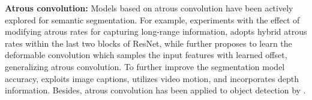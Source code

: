 \textbf{Atrous convolution:} Models based on atrous convolution have been actively explored for semantic segmentation. For example, \cite{wu2016bridging} experiments with the effect of modifying atrous rates for capturing long-range information, \cite{wang2017understanding} adopts hybrid atrous rates within the last two blocks of ResNet, while \cite{dai2017deformable} further proposes to learn the deformable convolution which samples the input features with learned offset, generalizing atrous convolution. To further improve the segmentation model accuracy, \cite{wanglearning} exploits image captions, \cite{jain2017fusionseg} utilizes video motion, and \cite{kong2017recurrent} incorporates depth information. Besides, atrous convolution has been applied to object detection by \cite{papandreou2014untangling, dai2016rfcn, huang2016speed}.
